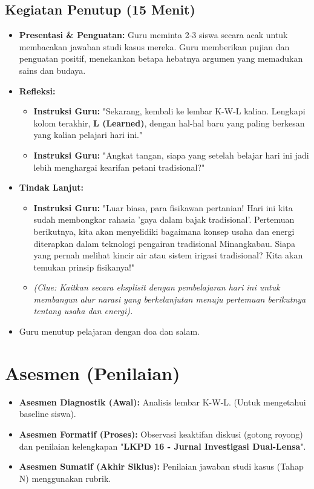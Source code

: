 \documentclass[12pt,a4paper]{article}
\begin{document}
\subsection{Kegiatan Penutup (15 Menit)}
\begin{itemize}
\item \textbf{Presentasi \& Penguatan:} Guru meminta 2-3 siswa secara acak untuk membacakan jawaban studi kasus mereka. Guru memberikan pujian dan penguatan positif, menekankan betapa hebatnya argumen yang memadukan sains dan budaya.
\item \textbf{Refleksi:}
    \begin{itemize}
    \item \textbf{Instruksi Guru:} "Sekarang, kembali ke lembar K-W-L kalian. Lengkapi kolom terakhir, \textbf{L (Learned)}, dengan hal-hal baru yang paling berkesan yang kalian pelajari hari ini."
    \item \textbf{Instruksi Guru:} "Angkat tangan, siapa yang setelah belajar hari ini jadi lebih menghargai kearifan petani tradisional?"
    \end{itemize}
\item \textbf{Tindak Lanjut:}
    \begin{itemize}
    \item \textbf{Instruksi Guru:} "Luar biasa, para fisikawan pertanian! Hari ini kita sudah membongkar rahasia 'gaya dalam bajak tradisional'. Pertemuan berikutnya, kita akan menyelidiki bagaimana konsep usaha dan energi diterapkan dalam teknologi pengairan tradisional Minangkabau. Siapa yang pernah melihat kincir air atau sistem irigasi tradisional? Kita akan temukan prinsip fisikanya!"
    \item \textit{(Clue: Kaitkan secara eksplisit dengan pembelajaran hari ini untuk membangun alur narasi yang berkelanjutan menuju pertemuan berikutnya tentang usaha dan energi).}
    \end{itemize}
\item Guru menutup pelajaran dengan doa dan salam.
\end{itemize}

\section{Asesmen (Penilaian)}

\begin{itemize}
\item \textbf{Asesmen Diagnostik (Awal):} Analisis lembar K-W-L. (Untuk mengetahui baseline siswa).
\item \textbf{Asesmen Formatif (Proses):} Observasi keaktifan diskusi (gotong royong) dan penilaian kelengkapan "\textbf{LKPD 16 - Jurnal Investigasi Dual-Lensa}".
\item \textbf{Asesmen Sumatif (Akhir Siklus):} Penilaian jawaban studi kasus (Tahap N) menggunakan rubrik.
\end{itemize}
\end{document}
